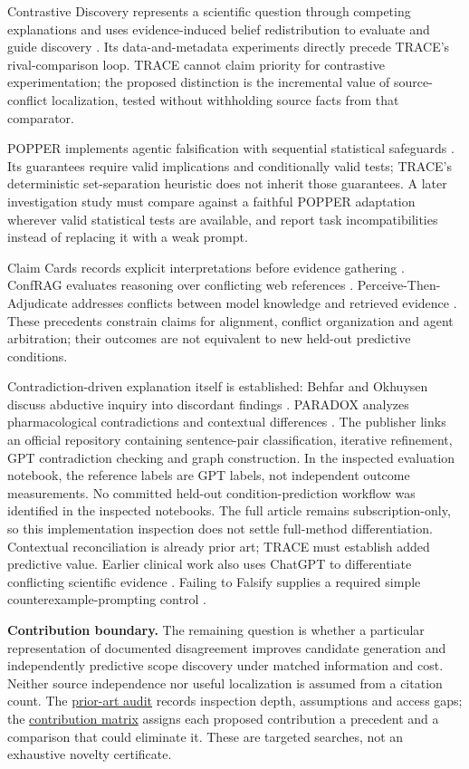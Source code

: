 \documentclass[11pt,a4paper]{article}
\begin{document}
Contrastive Discovery represents a scientific question through competing
explanations and uses evidence-induced belief redistribution to evaluate
and guide discovery \citep{R41}. Its data-and-metadata experiments
directly precede TRACE's rival-comparison loop. TRACE cannot claim
priority for contrastive experimentation; the proposed distinction is
the incremental value of source-conflict localization, tested without
withholding source facts from that comparator.

POPPER implements agentic falsification with sequential statistical
safeguards \citep{R42}. Its guarantees require valid implications and
conditionally valid tests; TRACE's deterministic set-separation
heuristic does not inherit those guarantees. A later investigation study
must compare against a faithful POPPER adaptation wherever valid
statistical tests are available, and report task incompatibilities
instead of replacing it with a weak prompt.

Claim Cards records explicit interpretations before evidence gathering
\citep{R43}. ConfRAG evaluates reasoning over conflicting web references
\citep{R44}. Perceive-Then-Adjudicate addresses conflicts between model
knowledge and retrieved evidence \citep{R46}. These precedents constrain
claims for alignment, conflict organization and agent arbitration; their
outcomes are not equivalent to new held-out predictive conditions.

Contradiction-driven explanation itself is established: Behfar and
Okhuysen discuss abductive inquiry into discordant findings \citep{R47}.
PARADOX analyzes pharmacological contradictions and contextual
differences \citep{R48}. The publisher links an official repository
containing sentence-pair classification, iterative refinement, GPT
contradiction checking and graph construction. In the inspected
evaluation notebook, the reference labels are GPT labels, not
independent outcome measurements. No committed held-out
condition-prediction workflow was identified in the inspected notebooks.
The full article remains subscription-only, so this implementation
inspection does not settle full-method differentiation. Contextual
reconciliation is already prior art; TRACE must establish added
predictive value. Earlier clinical work also uses ChatGPT to
differentiate conflicting scientific evidence \citep{R49}. Failing to
Falsify supplies a required simple counterexample-prompting control
\citep{R45}.

\textbf{Contribution boundary.} The remaining question is whether a
particular representation of documented disagreement improves candidate
generation and independently predictive scope discovery under matched
information and cost. Neither source independence nor useful
localization is assumed from a citation count. The
\href{https://gtcode.com/papers/trace/prior-art-audit.md}{prior-art
audit} records inspection depth, assumptions and access gaps; the
\href{https://gtcode.com/papers/trace/contribution-matrix.md}{contribution
matrix} assigns each proposed contribution a precedent and a comparison
that could eliminate it. These are targeted searches, not an exhaustive
novelty certificate.
\end{document}
